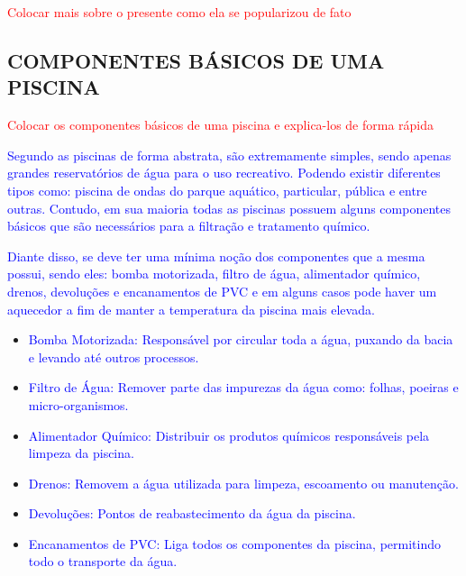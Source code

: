         \textcolor{red}{Colocar mais sobre o presente como ela se popularizou de fato}

    \subsection{COMPONENTES BÁSICOS DE UMA PISCINA}
        \textcolor{red}{Colocar os componentes básicos de uma piscina e explica-los de forma rápida}
    
        \textcolor{blue}{Segundo \cite{refComponents} as piscinas de forma abstrata, são extremamente simples, sendo apenas grandes reservatórios de água para o uso recreativo. Podendo existir diferentes tipos como: piscina de ondas do parque aquático, particular, pública e entre outras. Contudo, em sua maioria todas as piscinas possuem alguns componentes básicos que são necessários para a filtração e tratamento químico.}

        \textcolor{blue}{Diante disso, se deve ter uma mínima noção dos componentes que a mesma possui, sendo eles: bomba motorizada, filtro de água, alimentador químico, drenos, devoluções e encanamentos de PVC e em alguns casos pode haver um aquecedor a fim de manter a temperatura da piscina mais elevada.}

        \begin{itemize}
        
            \item \textcolor{blue}{Bomba Motorizada:}
                \textcolor{blue}{Responsável por circular toda a água, puxando da bacia e levando até outros processos.}

            \item \textcolor{blue}{Filtro de Água:}
                \textcolor{blue}{Remover parte das impurezas da água como: folhas, poeiras e micro-organismos.}

            \item \textcolor{blue}{Alimentador Químico:}
                \textcolor{blue}{Distribuir os produtos químicos responsáveis pela limpeza da piscina.}

            \item \textcolor{blue}{Drenos:}
                \textcolor{blue}{Removem a água utilizada para limpeza, escoamento ou manutenção.}

            \item \textcolor{blue}{Devoluções:}
                \textcolor{blue}{Pontos de reabastecimento da água da piscina.}

            \item \textcolor{blue}{Encanamentos de PVC:}
                \textcolor{blue}{Liga todos os componentes da piscina, permitindo todo o transporte da água.}
                
        \end{itemize}


